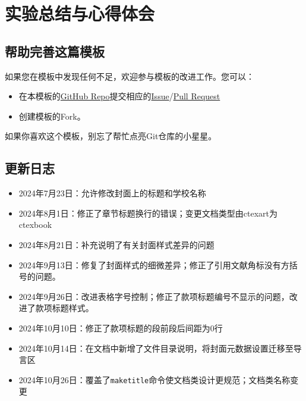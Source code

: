 \chapter{实验总结与心得体会}

\section{帮助完善这篇模板}\label{sec:joinus}

如果您在模板中发现任何不足，欢迎参与模板的改进工作。您可以：

\begin{itemize}
    \item 在本模板的\href{https://github.com/GitHubonline1396529/dlmuucexpreport}{GitHub Repo}提交相应的\href{https://github.com/GitHubonline1396529/dlmuucexpreport/issues}{Issue}/\href{https://github.com/GitHubonline1396529/dlmuucexpreport/pulls}{Pull Request}
    \item 创建模板的Fork。
\end{itemize}

如果你喜欢这个模板，别忘了帮忙点亮Git仓库的小星星。

\section{更新日志}

\begin{itemize}
    \item 2024年7月23日：允许修改封面上的标题和学校名称
    \item 2024年8月1日：修正了章节标题换行的错误；变更文档类型由ctexart为ctexbook
    \item 2024年8月21日：补充说明了有关封面样式差异的问题
    \item 2024年9月13日：修复了封面样式的细微差异；修正了引用文献角标没有方括号的问题。
    \item 2024年9月26日：改进表格字号控制；修正了款项标题编号不显示的问题，改进了款项标题样式。
    \item 2024年10月10日：修正了款项标题的段前段后间距为0行
    \item 2024年10月14日：在文档中新增了文件目录说明，将封面元数据设置迁移至导言区
    \item 2024年10月26日：覆盖了\texttt{maketitle}命令使文档类设计更规范；文档类名称变更
\end{itemize}